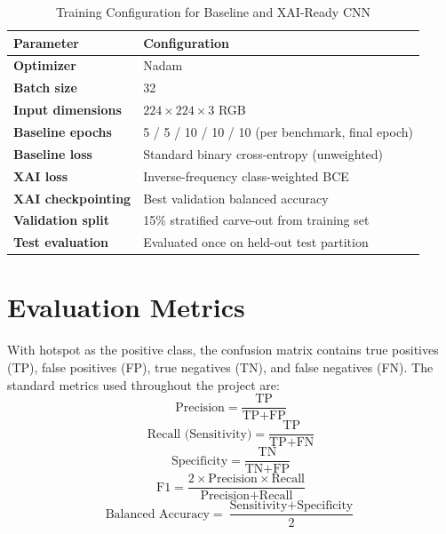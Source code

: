 \documentclass[conference]{IEEEtran}
\begin{document}
\begin{table}[htbp]
\caption{Training Configuration for Baseline and XAI-Ready CNN}
\label{tab:training_config}
\centering
\setlength{\tabcolsep}{3pt}
\begin{tabular}{p{}p{}}
\toprule
\textbf{Parameter} & \textbf{Configuration} \\
\midrule
\textbf{Optimizer} & Nadam \\
\textbf{Batch size} & 32 \\
\textbf{Input dimensions} & $224\times224\times3$ RGB \\
\textbf{Baseline epochs} & 5 / 5 / 10 / 10 / 10 (per benchmark, final epoch) \\
\textbf{Baseline loss} & Standard binary cross-entropy (unweighted) \\
\textbf{XAI loss} & Inverse-frequency class-weighted BCE \\
\textbf{XAI checkpointing} & Best validation balanced accuracy \\
\textbf{Validation split} & 15\% stratified carve-out from training set \\
\textbf{Test evaluation} & Evaluated once on held-out test partition \\
\bottomrule
\end{tabular}
\end{table}

\section{Evaluation Metrics}
With hotspot as the positive class, the confusion matrix contains true positives (TP), false positives (FP), true negatives (TN), and false negatives (FN). The standard metrics used throughout the project are:
\begin{equation}
\text{Precision} = \frac{\text{TP}}{\text{TP} + \text{FP}}
\end{equation}
\begin{equation}
\text{Recall (Sensitivity)} = \frac{\text{TP}}{\text{TP} + \text{FN}}
\end{equation}
\begin{equation}
\text{Specificity} = \frac{\text{TN}}{\text{TN} + \text{FP}}
\end{equation}
\begin{equation}
\text{F1} = \frac{2 \times \text{Precision} \times \text{Recall}}{\text{Precision} + \text{Recall}}
\end{equation}
\begin{equation}
\text{Balanced Accuracy} = \frac{\text{Sensitivity} + \text{Specificity}}{2}
\end{equation}
\end{document}
